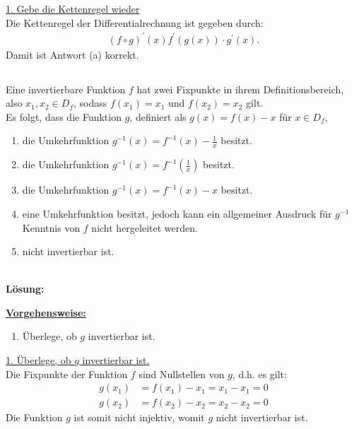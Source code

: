 \underline{1. Gebe die Kettenregel wieder}\\
Die Kettenregel der Differentialrechnung ist gegeben durch:
\begin{align*}
	(f \circ g)^\prime (x) f^\prime(g(x))  \cdot g^\prime(x).
\end{align*}
Damit ist Antwort (a) korrekt.
 


\newpage
\subsection*{}
Eine invertierbare Funktion $f$ hat zwei Fixpunkte in ihrem Definitionsbereich, also $x_1,x_2 \in D_f$, sodass $f(x_1) = x_1$ und $f(x_2) = x_2$ gilt.\\
Es folgt, dass die Funktion $g$, definiert als $g(x) = f(x) - x$ für $x \in D_f$,
\renewcommand{\labelenumi}{(\alph{enumi})}
\begin{enumerate}
	\item 
	die Umkehrfunktion $g^{-1}(x) = f^{-1}(x) - \frac{1}{x} $ besitzt.
	\item
	die Umkehrfunktion $g^{-1}(x) = f^{-1}\left(\frac{1}{x}\right) $ besitzt.
	\item
	die Umkehrfunktion $g^{-1}(x) = f^{-1}(x) - x $ besitzt.
	\item
	eine Umkehrfunktion besitzt, jedoch kann ein allgemeiner Ausdruck für $g^{-1} $ Kenntnis von $f$ nicht hergeleitet werden.
	\item
	nicht invertierbar ist.
\end{enumerate}
\ \\
\textbf{Lösung:}
\begin{mdframed}
\underline{\textbf{Vorgehensweise:}}
\renewcommand{\labelenumi}{\theenumi.}
\begin{enumerate}
\item Überlege, ob $g $ invertierbar ist.
\end{enumerate}
\end{mdframed}

\underline{1. Überlege, ob $g $ invertierbar ist.}\\
Die Fixpunkte der Funktion $f$ sind Nullstellen von $g$, d.h. es gilt:
\begin{align*}
	g(x_1 ) &= f(x_1) -x_1 = x_1 - x_1 = 0\\
	g(x_2 ) &= f(x_2) -x_2 = x_2 - x_2 = 0
\end{align*}
Die Funktion $g$ ist somit nicht injektiv, womit $g$ nicht invertierbar ist.


